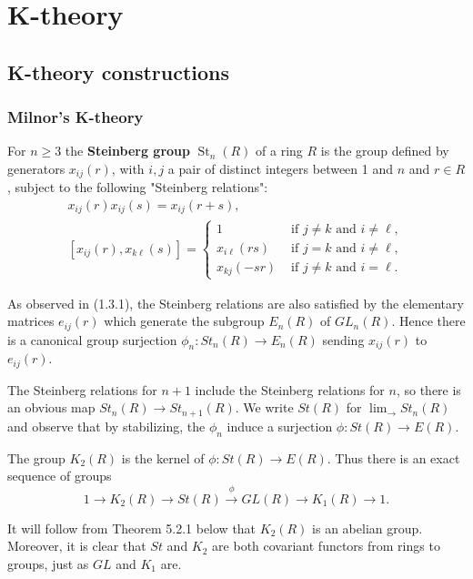 
\part{K-theory}
\chapter{K-theory constructions} 

\section{Milnor's K-theory}

For $n \geq 3$ the \textbf{Steinberg group} $\operatorname{St}_n(R)$ of a ring $R$ is the group defined by generators $x_{i j}(r)$, with $i, j$ a pair of distinct integers between 1 and $n$ and $r \in R$, subject to the following "Steinberg relations":
$$
\begin{gathered}
x_{i j}(r) x_{i j}(s)=x_{i j}(r+s), \\
{\left[x_{i j}(r), x_{k \ell}(s)\right]= \begin{cases}1 & \text { if } j \neq k \text { and } i \neq \ell, \\
x_{i \ell}(r s) & \text { if } j=k \text { and } i \neq \ell, \\
x_{k j}(-s r) & \text { if } j \neq k \text { and } i=\ell .\end{cases} }
\end{gathered}
$$

As observed in (1.3.1), the Steinberg relations are also satisfied by the elementary matrices $e_{i j}(r)$ which generate the subgroup $E_n(R)$ of $G L_n(R)$. Hence there is a canonical group surjection $\phi_n: S t_n(R) \rightarrow E_n(R)$ sending $x_{i j}(r)$ to $e_{i j}(r)$.

The Steinberg relations for $n+1$ include the Steinberg relations for $n$, so there is an obvious map $S t_n(R) \rightarrow S t_{n+1}(R)$. We write $S t(R)$ for $\lim _{\longrightarrow} S t_n(R)$ and observe that by stabilizing, the $\phi_n$ induce a surjection $\phi: S t(R) \rightarrow E(R)$.


The group $K_2(R)$ is the kernel of $\phi: S t(R) \rightarrow E(R)$. Thus there is an exact sequence of groups
$$
1 \rightarrow K_2(R) \rightarrow S t(R) \xrightarrow{\phi} G L(R) \rightarrow K_1(R) \rightarrow 1 .
$$

It will follow from Theorem 5.2.1 below that $K_2(R)$ is an abelian group. Moreover, it is clear that $S t$ and $K_2$ are both covariant functors from rings to groups, just as $G L$ and $K_1$ are.

